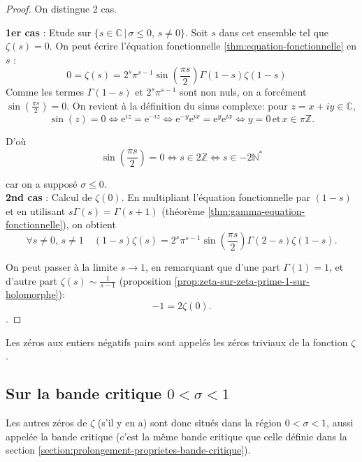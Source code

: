 \documentclass[french]{report}
\begin{document}
\begin{proof}
  On distingue 2 cas.

  \textbf{1er cas} : Etude sur $\{s\in\mathbb{C}\,|\,\sigma\leq 0,\,s\neq 0\}$. Soit $s$ dans cet ensemble tel que $\zeta(s)=0$. On peut écrire l'équation fonctionnelle \ref{thm:equation-fonctionnelle} en $s$ :
  \[
    0 = \zeta(s)
    = 2^s\pi^{s-1}\sin\left(\frac{\pi s}{2}\right)\Gamma(1-s)\zeta(1-s)\quad
  \]
  Comme les termes $\Gamma(1-s)$ et $2^s\pi^{s-1}$ sont non nuls, on a forcément $\sin(\frac{\pi s}{2})=0$. On revient à la définition du sinus complexe: pour $z=x+iy\in\mathbb{C}$,
  \[
    \sin(z)=0
    \Leftrightarrow \mathrm{e}^{iz}=\mathrm{e}^{-iz}\Leftrightarrow \mathrm{e}^{-y}\mathrm{e}^{ix}=\mathrm{e}^y\mathrm{e}^{ix}
    \Leftrightarrow y=0\,\mathrm{et}\,x\in\pi\mathbb{Z}.
  \]
  
  D'où 
  \[
    \sin(\frac{\pi s}{2})=0
    \Leftrightarrow s\in2\mathbb{Z}
    \Leftrightarrow s\in-2\mathbb{N}^*
  \]

  car on a supposé $\sigma\leq 0$.
  \\
  
  \textbf{2nd cas} : Calcul de $\zeta(0)$. En multipliant l'équation fonctionnelle par $(1-s)$ et en utilisant $s\Gamma(s)=\Gamma(s+1)$ (théorème \ref{thm:gamma-equation-fonctionnelle}), on obtient
  \[
    \forall s\neq0,\,s\neq1\quad
    (1-s)\zeta(s) = 2^s\pi^{s-1}\sin\left(\frac{\pi s}{2}\right)\Gamma(2-s)\zeta(1-s).
  \]

  On peut passer à la limite $s\to1$, en remarquant que d'une part $\Gamma(1)=1$, et d'autre part $\zeta(s)\sim\frac{1}{s-1}$ (proposition \ref{prop:zeta-sur-zeta-prime-1-sur-holomorphe}):
  \[
    -1 = 2\zeta(0).
  \].
\end{proof}

Les zéros aux entiers négatifs pairs sont appelés les zéros triviaux de la fonction $\zeta$.

\subsection{Sur la bande critique $0<\sigma<1$}

Les autres zéros de $\zeta$ (s'il y en a) sont donc situés dans la région $0<\sigma<1$, aussi appelée la bande critique (c'est la même bande critique que celle définie dans la section \ref{section:prolongement-proprietes-bande-critique}).
\\
\end{document}
